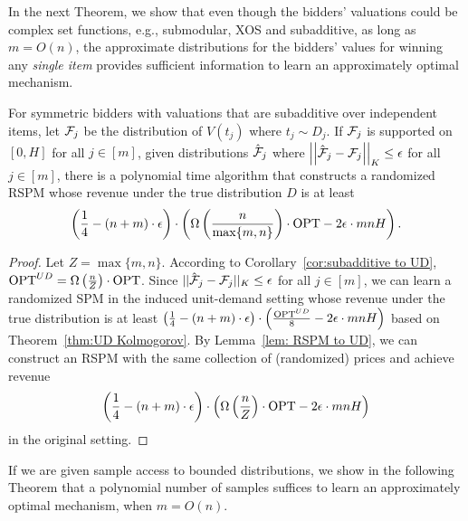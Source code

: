 In the next Theorem, we show that even though the bidders' valuations could be complex set functions, e.g., submodular, XOS and subadditive, as long as $m=O(n)$, the approximate distributions for the bidders' values for winning any \emph{single item} provides sufficient information to learn an approximately optimal mechanism. 

\begin{theorem} \label{thm:subadditive Kolmogorov}
	For symmetric bidders with valuations that are subadditive over independent items, let ${\mathcal{F}}_j$ be the distribution of $V(t_j)$ where $t_j\sim D_j$. If ${\mathcal{F}}_j$ is supported on $[0,H]$ for all $j\in[m]$, given distributions $\hat{{\mathcal{F}}}_{j}$ where $\left|\left|\hat{{\mathcal{F}}}_{j}-{\mathcal{F}}_{j}\right|\right|_K\leq \epsilon$ for all $j\in[m]$, there is a polynomial time algorithm that constructs a randomized RSPM whose revenue under the true distribution $D$ is at least  $$\left(\frac{1}{4}-(n+m)\cdot \epsilon\right)\cdot\left(\Omega\left(\frac{n}{\max\{m,n\}}\right)\cdot \text{OPT}-2\epsilon\cdot mnH\right).$$
\end{theorem}
\begin{proof}
 Let $Z=\max\{m,n\}$. According to Corollary~\ref{cor:subadditive to UD}, $\text{OPT}^{UD}=\Omega\left(\frac{n}{Z}\right)\cdot \text{OPT}$. Since $||\hat{{\mathcal{F}}}_{j}-{\mathcal{F}}_{j}||_K\leq \epsilon$ for all $j\in[m]$, we can learn a randomized SPM in the induced unit-demand setting whose revenue under the true distribution is at least $\left(\frac{1}{4}-(n+m)\cdot \epsilon\right)\cdot\left(\frac{\text{OPT}^{UD}}{8}-2\epsilon\cdot mnH\right)$ based on Theorem~\ref{thm:UD Kolmogorov}.  By Lemma~\ref{lem: RSPM to UD},  we can construct an RSPM with the same collection of (randomized) prices and achieve revenue $$\left(\frac{1}{4}-(n+m)\cdot \epsilon\right)\cdot\left(\Omega\left(\frac{n}{Z}\right)\cdot \text{OPT}-2\epsilon\cdot mnH\right)$$ in the original setting.\end{proof}

If we are given sample access to bounded distributions, we show in the following Theorem that a polynomial number of samples suffices to learn an approximately optimal mechanism, when $m=O(n)$.

